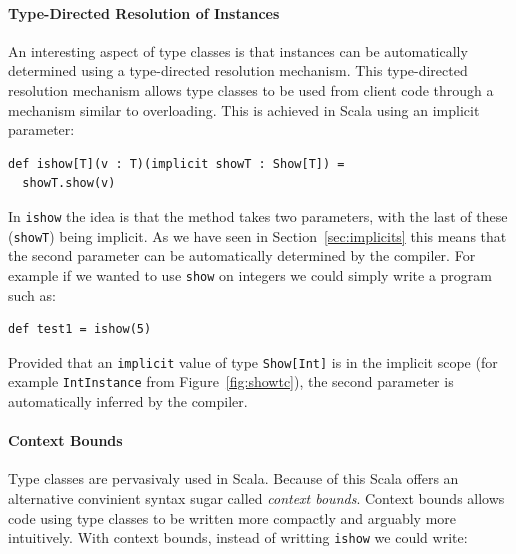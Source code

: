 \documentclass[preprint,nocopyrightspace]{sigplanconf}
\begin{document}


\paragraph{Type-Directed Resolution of Instances} An interesting
aspect of type classes is that instances can be automatically
determined using a type-directed resolution mechanism. This
type-directed resolution mechanism allows type classes
to be used from client code through a mechanism similar to
overloading. This is achieved in Scala using an implicit
parameter:

\begin{lstlisting}
def ishow[T](v : T)(implicit showT : Show[T]) =
  showT.show(v)
\end{lstlisting}

In \lstinline{ishow} the idea is that the method takes two parameters,
with the last of these (\lstinline{showT}) being implicit. As we have
seen in Section~\ref{sec:implicits} this means that the second
parameter can be automatically determined by the compiler.  For
example if we wanted to use \lstinline{show} on integers we could
simply write a program such as:

\begin{lstlisting}
def test1 = ishow(5)
\end{lstlisting}

Provided that an \lstinline{implicit} value of type
\lstinline{Show[Int]} is in the implicit scope (for example
\lstinline{IntInstance} from Figure~\ref{fig:showtc}), the second
parameter is automatically inferred by the compiler.

\paragraph{Context Bounds} Type classes are pervasivaly used in
Scala. Because of this Scala offers an alternative convinient syntax sugar called
\emph{context bounds}. Context bounds allows code using type classes to be
written more compactly and arguably more intuitively. With context
bounds, instead of writting \lstinline{ishow} we could write:
\end{document}
